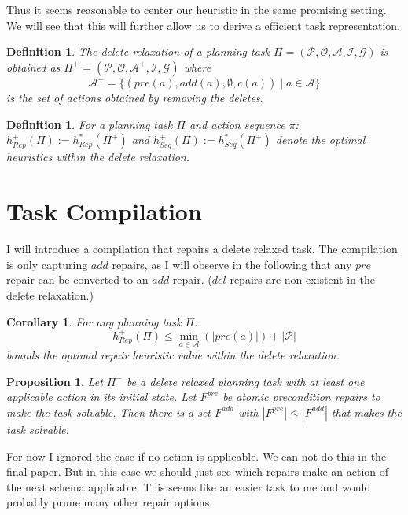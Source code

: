\documentclass[twocolumn]{article}
\newcommand{\task}{\ensuremath{\Pi}\xspace}
\newcommand{\preds}{\ensuremath{\mathcal{P}}\xspace}
\newcommand{\acts}{\ensuremath{\mathcal{A}}\xspace}
\newcommand{\objects}{\ensuremath{\mathcal{O}}\xspace}
\newcommand{\init}{\ensuremath{\mathcal{I}}\xspace}
\newcommand{\goal}{\ensuremath{\mathcal{G}}\xspace}
\newcommand{\prename}{\ensuremath{pre}\xspace}
\newcommand{\addname}{\ensuremath{add}\xspace}
\newcommand{\delname}{\ensuremath{del}\xspace}
\newcommand{\pre}[1]{\ensuremath{\prename(#1)}\xspace}
\newcommand{\add}[1]{\ensuremath{\addname(#1)}\xspace}
\newcommand{\arity}[1]{\ensuremath{|#1|}}
\newcommand{\cost}[1]{\ensuremath{c(#1)}\xspace}
\newcommand{\fixPre}{\ensuremath{F^{\prename}}\xspace}
\newcommand{\fixAdd}{\ensuremath{F^{\addname}}\xspace}
\newcommand{\someAct}{\ensuremath{a}\xspace}
\newcommand{\someActSeq}{\ensuremath{\pi}\xspace}
\newcommand{\optimalHeuristic}{\ensuremath{h^{*}_{Rep}}\xspace}
\newcommand{\optimalHeuristicSeq}{\ensuremath{h^{*}_{Seq}}\xspace}
\newcommand{\optimalHeuristicRel}{\ensuremath{h^{+}_{Rep}}\xspace}
\newcommand{\optimalHeuristicSeqRel}{\ensuremath{h^{+}_{Seq}}\xspace}
\newcommand{\relaxedActs}{\ensuremath{\acts^{+}}\xspace}
\newcommand{\relaxedTask}{\ensuremath{\task^{+}}\xspace}
\newtheorem{proposition}[theorem]{Proposition}
\newtheorem{corollary}[theorem]{Corollary}
\newtheorem{definition}[theorem]{Definition}
\begin{document}
	
	Thus it seems reasonable to center our heuristic in the same promising setting.
	We will see that this will further allow us to derive a efficient task representation.
	
	
	
	\begin{definition}
		The delete relaxation of a planning task
		$\task = (\preds, \objects, \acts, \init, \goal)$
		is obtained as
		$\relaxedTask = (\preds, \objects, \relaxedActs, \init, \goal)$
		where 
		$$
		\relaxedActs = \{
		(\pre{\someAct}, \add{\someAct}, \emptyset, \cost{\someAct}) \mid \someAct \in \acts
		\}
		$$
		is the set of actions obtained by removing the deletes.
	\end{definition}
	
	\begin{definition}
		For a planning task \task and action sequence \someActSeq:
		$\optimalHeuristicRel(\task) := \optimalHeuristic(\relaxedTask)$
		and 
		$\optimalHeuristicSeqRel(\task) := \optimalHeuristicSeq(\relaxedTask)$
		denote the optimal heuristics within the delete relaxation.
	\end{definition}
	
	
	\section{Task Compilation}
	
	I will introduce a compilation that repairs a delete relaxed task.
	The compilation is only capturing \addname repairs, as I will observe in the following that any \prename repair can be converted to an \addname repair.
	(\delname repairs are non-existent in the delete relaxation.)
	
	\begin{corollary}
		For any planning task \task:
		$$\optimalHeuristicRel(\task) \leq \min_{\someAct \in \acts}(\arity{\pre{\someAct}}) + \arity{\preds}$$
		bounds the optimal repair heuristic value within the delete relaxation.
	\end{corollary}
	
	\begin{proposition}
		Let \relaxedTask be a delete relaxed planning task with at least one applicable action in its initial state.
		Let \fixPre be atomic precondition repairs to make the task solvable.
		Then there is a set \fixAdd with $\arity{\fixPre} \leq \arity{\fixAdd}$ that makes the task solvable.
	\end{proposition}
	
	For now I ignored the case if no action is applicable. 
	We can not do this in the final paper.
	But in this case we should just see which repairs make an action of the next schema applicable. 
	This seems like an easier task to me and would probably prune many other repair options.
	
\end{document}
